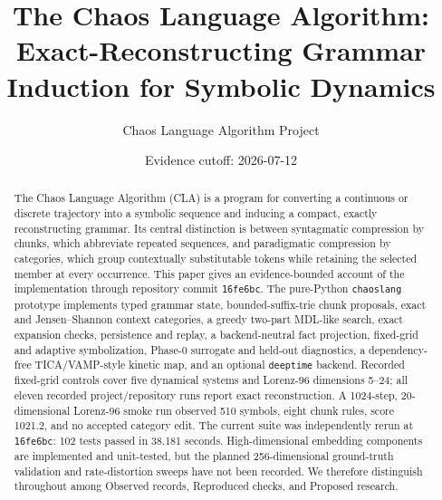 \documentclass[11pt]{article}
\title{The Chaos Language Algorithm:\\Exact-Reconstructing Grammar Induction for Symbolic Dynamics}
\author{Chaos Language Algorithm Project}
\date{Evidence cutoff: 2026-07-12}
\begin{document}
\maketitle

\begin{abstract}
The Chaos Language Algorithm (CLA) is a program for converting a continuous or discrete trajectory into a symbolic sequence and inducing a compact, exactly reconstructing grammar. Its central distinction is between syntagmatic compression by chunks, which abbreviate repeated sequences, and paradigmatic compression by categories, which group contextually substitutable tokens while retaining the selected member at every occurrence. This paper gives an evidence-bounded account of the implementation through repository commit \texttt{16fe6bc}. The pure-Python \texttt{chaoslang} prototype implements typed grammar state, bounded-suffix-trie chunk proposals, exact and Jensen--Shannon context categories, a greedy two-part MDL-like search, exact expansion checks, persistence and replay, a backend-neutral fact projection, fixed-grid and adaptive symbolization, Phase-0 surrogate and held-out diagnostics, a dependency-free TICA/VAMP-style kinetic map, and an optional \texttt{deeptime} backend. Recorded fixed-grid controls cover five dynamical systems and Lorenz-96 dimensions 5--24; all eleven recorded project/repository runs report exact reconstruction. A 1024-step, 20-dimensional Lorenz-96 smoke run observed 510 symbols, eight chunk rules, score 1021.2, and no accepted category edit. The current suite was independently rerun at \texttt{16fe6bc}: 102 tests passed in 38.181 seconds. High-dimensional embedding components are implemented and unit-tested, but the planned 256-dimensional ground-truth validation and rate-distortion sweeps have not been recorded. We therefore distinguish throughout among Observed records, Reproduced checks, and Proposed research.
\end{abstract}
\end{document}
